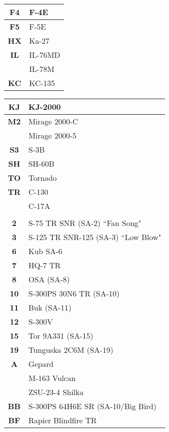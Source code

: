 \documentclass[fontMetropolis]{TechCheck}
\begin{document}
\begin{multicols*}{2}
\begin{center}
\begin{tabular}{c | p{4cm}}
			\midrule
			\textbf{F4} & F-4E \\
			\midrule
			\textbf{F5} & F-5E \\
			\midrule
			\textbf{HX} & Ka-27 \\
			\midrule
			\textbf{IL} & IL-76MD \\
			& IL-78M \\
			\midrule
			\textbf{KC} & KC-135 \\
			\midrule
		\end{tabular}
	\end{center}
	\begin{center}
		\begin{tabular}{c | p{4cm}}
			\textbf{KJ} & KJ-2000 \\
			\midrule
			\textbf{M2} & Mirage 2000-C \\
			& Mirage 2000-5 \\
			\midrule
			\textbf{S3} & S-3B \\
			\midrule
			\textbf{SH} & SH-60B \\
			\midrule
			\textbf{TO} & Tornado \\
			\midrule
			\textbf{TR} & C-130 \\
			& C-17A \\
			\toprule
			\multicolumn{2}{c}{\blue{AIR DEFENSE}} \\
			\toprule
			\textbf{2} & S-75 TR SNR (SA-2) ``Fan Song" \\
			\midrule
			\textbf{3} & S-125 TR SNR-125 (SA-3) ``Low Blow" \\
			\midrule
			\textbf{6} & Kub SA-6 \\
			\midrule
			\textbf{7} & HQ-7 TR \\
			\midrule
			\textbf{8} & OSA (SA-8) \\
			\midrule
			\textbf{10} & S-300PS 30N6 TR (SA-10) \\
			\midrule
			\textbf{11} & Buk (SA-11) \\
			\midrule
			\textbf{12} & S-300V \\
			\midrule
			\textbf{15} & Tor 9A331 (SA-15) \\
			\midrule
			\textbf{19} & Tunguska 2C6M (SA-19) \\
			\midrule
			\textbf{A} & Gepard \\
			& M-163 Vulcan \\
			& ZSU-23-4 Shilka \\
			\midrule
			\textbf{BB} & S-300PS 64H6E SR (SA-10/Big Bird) \\
			\midrule
			\textbf{BF} & Rapier Blindfire TR \\

\end{tabular}
\end{center}
\end{multicols*}
\end{document}
